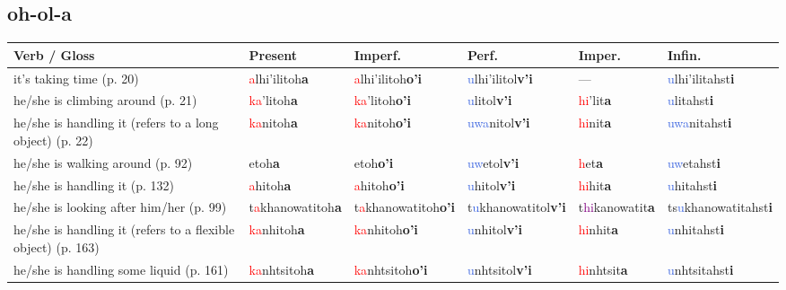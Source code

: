 \documentclass[oneside,openany]{book}%
\begin{document}
\subsection*{oh-ol-a}%
\begin{tabularx}{\textwidth}{>{\hsize=1.5\hsize\RaggedRight}X >{\hsize=0.9\hsize}X >{\hsize=0.9\hsize}X >{\hsize=0.9\hsize}X >{\hsize=0.9\hsize}X >{\hsize=0.9\hsize}X}%
\toprule%
\textbf{Verb / Gloss}&\textbf{Present}&\textbf{Imperf.}&\textbf{Perf.}&\textbf{Imper.}&\textbf{Infin.}\\%
\midrule%
it's taking time (p. 20)&\textcolor{Red}{a}lhi'ilitoh\textbf{a}&\textcolor{Red}{a}lhi'ilitoh\textbf{o'i}&\textcolor{RoyalBlue}{u}lhi'ilitol\textbf{v'i}&---&\textcolor{RoyalBlue}{u}lhi'ilitahst\textbf{i}\\%
he/she is climbing around (p. 21)&\textcolor{Red}{ka}'litoh\textbf{a}&\textcolor{Red}{ka}'litoh\textbf{o'i}&\textcolor{RoyalBlue}{u}litol\textbf{v'i}&\textcolor{Red}{hi}'lit\textbf{a}&\textcolor{RoyalBlue}{u}litahst\textbf{i}\\%
he/she is handling it (refers to a long object) (p. 22)&\textcolor{Red}{ka}nitoh\textbf{a}&\textcolor{Red}{ka}nitoh\textbf{o'i}&\textcolor{RoyalBlue}{uwa}nitol\textbf{v'i}&\textcolor{Red}{hi}nit\textbf{a}&\textcolor{RoyalBlue}{uwa}nitahst\textbf{i}\\%
he/she is walking around (p. 92)&etoh\textbf{a}&etoh\textbf{o'i}&\textcolor{RoyalBlue}{uw}etol\textbf{v'i}&\textcolor{Red}{h}et\textbf{a}&\textcolor{RoyalBlue}{uw}etahst\textbf{i}\\%
he/she is handling it (p. 132)&\textcolor{Red}{a}hitoh\textbf{a}&\textcolor{Red}{a}hitoh\textbf{o'i}&\textcolor{RoyalBlue}{u}hitol\textbf{v'i}&\textcolor{Red}{hi}hit\textbf{a}&\textcolor{RoyalBlue}{u}hitahst\textbf{i}\\%
he/she is looking after him/her (p. 99)&t\textcolor{Red}{a}khanowatitoh\textbf{a}&t\textcolor{Red}{a}khanowatitoh\textbf{o'i}&t\textcolor{RoyalBlue}{u}khanowatitol\textbf{v'i}&t\textcolor{Purple}{hi}kanowatit\textbf{a}&ts\textcolor{RoyalBlue}{u}khanowatitahst\textbf{i}\\%
he/she is handling it (refers to a flexible object) (p. 163)&\textcolor{Red}{ka}nhitoh\textbf{a}&\textcolor{Red}{ka}nhitoh\textbf{o'i}&\textcolor{RoyalBlue}{u}nhitol\textbf{v'i}&\textcolor{Red}{hi}nhit\textbf{a}&\textcolor{RoyalBlue}{u}nhitahst\textbf{i}\\%
he/she is handling some liquid (p. 161)&\textcolor{Red}{ka}nhtsitoh\textbf{a}&\textcolor{Red}{ka}nhtsitoh\textbf{o'i}&\textcolor{RoyalBlue}{u}nhtsitol\textbf{v'i}&\textcolor{Red}{hi}nhtsit\textbf{a}&\textcolor{RoyalBlue}{u}nhtsitahst\textbf{i}\\%

\end{tabularx}
\end{document}
